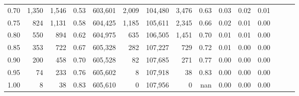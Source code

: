 \begin{tabular}{rrrrrrrrrrrrrrr}
0.70 &    1,350 &   1,546 &  0.53 &  603,601 &    2,009 &  104,480 &    3,476 &  0.63 &  0.03 &  0.02 &      0.01 \\
0.75 &      824 &   1,131 &  0.58 &  604,425 &    1,185 &  105,611 &    2,345 &  0.66 &  0.02 &  0.01 &      0.00 \\
0.80 &      550 &     894 &  0.62 &  604,975 &      635 &  106,505 &    1,451 &  0.70 &  0.01 &  0.01 &      0.00 \\
0.85 &      353 &     722 &  0.67 &  605,328 &      282 &  107,227 &      729 &  0.72 &  0.01 &  0.00 &      0.00 \\
0.90 &      200 &     458 &  0.70 &  605,528 &       82 &  107,685 &      271 &  0.77 &  0.00 &  0.00 &      0.00 \\
0.95 &       74 &     233 &  0.76 &  605,602 &        8 &  107,918 &       38 &  0.83 &  0.00 &  0.00 &      0.00 \\
1.00 &        8 &      38 &  0.83 &  605,610 &        0 &  107,956 &        0 &   nan &  0.00 &  0.00 &      0.00 \\
\bottomrule
\end{tabular}
